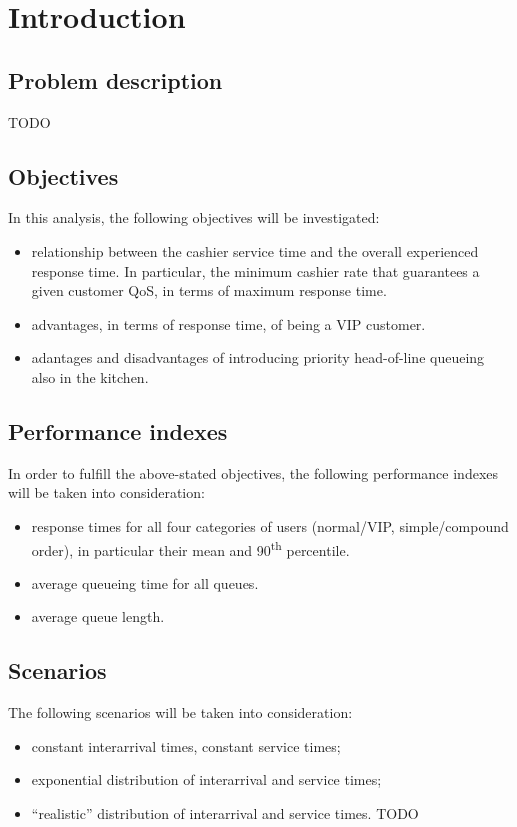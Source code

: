 \section{Introduction}

\subsection{Problem description}
TODO

\subsection{Objectives}
In this analysis, the following objectives will be investigated:
\begin{itemize}
    \item relationship between the cashier service time and the overall experienced
        response time. In particular, the minimum cashier rate that guarantees a 
        given customer QoS, in terms of maximum response time.
    \item advantages, in terms of response time, of being a VIP customer.
    \item adantages and disadvantages of introducing priority head-of-line queueing
        also in the kitchen.
\end{itemize}

\subsection{Performance indexes}
In order to fulfill the above-stated objectives, the following performance 
indexes will be taken into consideration:
\begin{itemize}
    \item response times for all four categories of users (normal/VIP, 
    simple/compound order), in particular their mean and 90\textsuperscript{th} 
    percentile.
    \item average queueing time for all queues.
    \item average queue length.
\end{itemize}

\subsection{Scenarios}
The following scenarios will be taken into consideration:
\begin{itemize}
    \item constant interarrival times, constant service times;
    \item exponential distribution of interarrival and service times;
    \item ``realistic'' distribution of interarrival and service times. TODO
\end{itemize}
